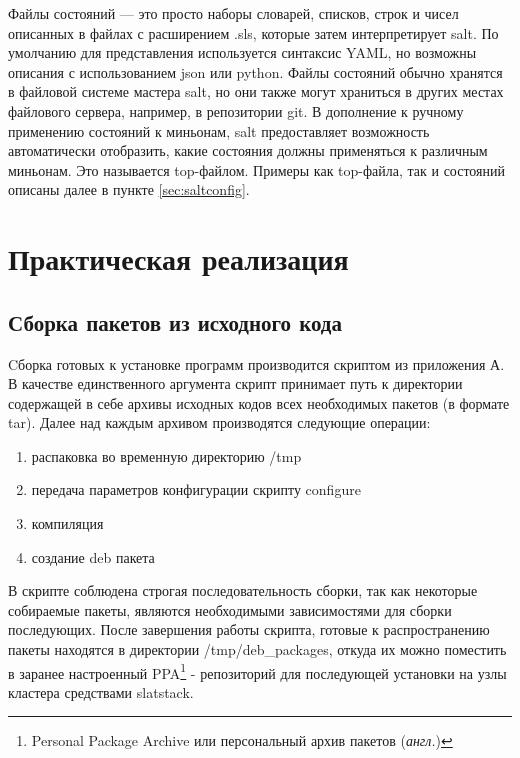 \documentclass[a4paper]{extarticle}
\begin{document}
Файлы состояний --- это просто наборы словарей, списков, строк и чисел описанных в файлах с расширением .sls, которые затем интерпретирует salt. По умолчанию для представления используется синтаксис YAML, но возможны описания с использованием json или python. Файлы состояний обычно хранятся в файловой системе мастера salt, но они также могут храниться в других местах файлового сервера, например, в репозитории git. В дополнение к ручному применению состояний к миньонам, salt предоставляет возможность автоматически отобразить, какие состояния должны применяться к различным миньонам. Это называется top-файлом. Примеры как top-файла, так и состояний описаны далее в пункте \ref{sec:saltconfig}.

\newpage

\section{Практическая реализация}

\setcounter{figure}{0}

\subsection{Сборка пакетов из исходного кода}

Cборка готовых к установке программ производится скриптом из приложения А. В качестве единственного аргумента скрипт принимает путь к директории содержащей в себе архивы исходных
кодов всех необходимых пакетов (в формате tar).  Далее над каждым архивом производятся следующие операции:

\begin{enumerate}
\item распаковка во временную директорию /tmp
\item передача параметров конфигурации скрипту configure
\item компиляция
\item создание deb пакета
\end{enumerate}

В скрипте соблюдена строгая последовательность сборки, так как некоторые собираемые пакеты, являются необходимыми зависимостями для сборки последующих.
После завершения работы скрипта, готовые к распространению пакеты находятся в директории /tmp/deb\_packages, откуда их можно поместить в заранее настроенный PPA\footnote{Personal Package Archive или персональный архив пакетов (\emph{англ.})}  - репозиторий для последующей установки на узлы кластера средствами slatstack.
\end{document}
